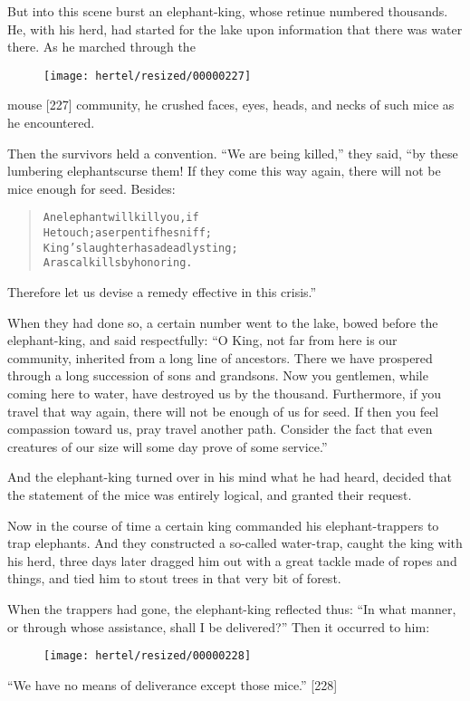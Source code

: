 \documentclass[article, twoside, 10pt]{memoir}
\renewenvironment{verbatim}{%
\begin{quote}%
\vskip -10pt%
\begin{alltt}\normalfont\small}{\end{alltt}%
\end{quote}%
\vskip -10pt
} %
\begin{document}
But into this scene burst an elephant-king, whose retinue numbered
thousands. He, with his herd, had started for the lake upon
information that there was water there. As he marched through the
\begin{figure}[p]\texttt{[image: hertel/resized/00000227]}\end{figure}mouse [227] community, he crushed faces, eyes, heads, and necks of
such mice as he encountered.

Then the survivors held a convention. ``We are being killed,'' they
said, “by these lumbering elephants{\textemdash}curse them! If they come this
way again, there will not be mice enough for seed. Besides:

\begin{verbatim}
An elephant will kill you, if
He touch; a serpent if he sniff;
King's laughter has a deadly sting;
A rascal kills by honoring.
\end{verbatim}
Therefore let us devise a remedy effective in this crisis.”

When they had done so, a certain number went to the lake, bowed
before the elephant-king, and said respectfully:
``O King, not far from here is our community, inherited from a long line of ancestors. There we have prospered through a long succession of sons and grandsons. Now you gentlemen, while coming here to water, have destroyed us by the thousand. Furthermore, if you travel that way again, there will not be enough of us for seed. If then you feel compassion toward us, pray travel another path. Consider the fact that even creatures of our size will some day prove of some service.''

And the elephant-king turned over in his mind what he had heard,
decided that the statement of the mice was entirely logical, and
granted their request.

Now in the course of time a certain king commanded his
elephant-trappers to trap elephants. And they constructed a
so-called water-trap, caught the king with his herd, three days
later dragged him out with a great tackle made of ropes and things,
and tied him to stout trees in that very bit of forest.

When the trappers had gone, the elephant-king reflected thus:
``In what manner, or through whose assistance, shall I be delivered?''
Then it occurred to him:
\begin{figure}[p]\texttt{[image: hertel/resized/00000228]}\end{figure}``We have no means of deliverance except those mice.'' [228]
\end{document}
